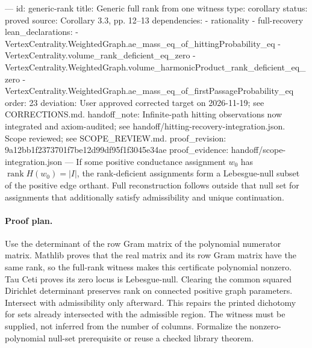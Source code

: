 ---
id: generic-rank
title: Generic full rank from one witness
type: corollary
status: proved
source: Corollary 3.3, pp. 12–13
dependencies:
- rationality
- full-recovery
lean_declarations:
- VertexCentrality.WeightedGraph.ae_mass_eq_of_hittingProbability_eq
- VertexCentrality.volume_rank_deficient_eq_zero
- VertexCentrality.WeightedGraph.volume_harmonicProduct_rank_deficient_eq_zero
- VertexCentrality.WeightedGraph.ae_mass_eq_of_firstPassageProbability_eq
order: 23
deviation: User approved corrected target on 2026-11-19; see CORRECTIONS.md.
handoff_note: Infinite-path hitting observations now integrated and axiom-audited; see handoff/hitting-recovery-integration.json. Scope reviewed; see SCOPE_REVIEW.md.
proof_revision: 9a12bb1f2373701f7be12d99df95f1f3045e34ae
proof_evidence: handoff/scope-integration.json
---
If some positive conductance assignment $w_0$ has $\operatorname{rank}H(w_0)=|I|$, the rank-deficient assignments form a Lebesgue-null subset of the positive edge orthant. Full reconstruction follows outside that null set for assignments that additionally satisfy admissibility and unique continuation.

\paragraph{Proof plan.}
Use the determinant of the row Gram matrix of the polynomial numerator matrix. Mathlib proves that the real matrix and its row Gram matrix have the same rank, so the full-rank witness makes this certificate polynomial nonzero. Tau Ceti proves its zero locus is Lebesgue-null. Clearing the common squared Dirichlet determinant preserves rank on connected positive graph parameters. Intersect with admissibility only afterward. This repairs the printed dichotomy for sets already intersected with the admissible region. The witness must be supplied, not inferred from the number of columns. Formalize the nonzero-polynomial null-set prerequisite or reuse a checked library theorem.
